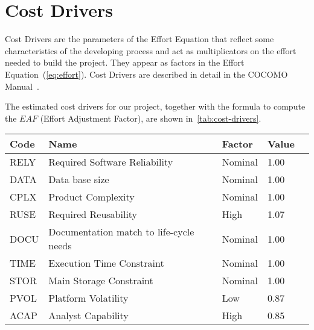 \section{Cost Drivers}

Cost Drivers are the parameters of the Effort Equation that reflect some characteristics of the developing process and act as multiplicators on the effort needed to build the project. They appear as factors in the Effort Equation~(\autoref{eq:effort}). Cost Drivers are described in detail in the COCOMO Manual~\cite[p.~25]{cocomo-manual}.

The estimated cost drivers for our project, together with the formula to compute the $EAF$ (Effort Adjustment Factor), are shown in~\autoref{tab:cost-drivers}.

\begin{table}[p]
    \centering
    \begin{tabular}{| l | l | l | l | l |}
        \hline
        \textbf{Code}   & \textbf{Name}                             & \textbf{Factor}      & \textbf{Value}    \\
        \hline
        RELY            & Required Software Reliability             & Nominal              & 1.00              \\
        \hline
        DATA            & Data base size                            & Nominal              & 1.00              \\
        \hline
        CPLX            & Product Complexity                        & Nominal              & 1.00              \\
        \hline
        RUSE            & Required Reusability                      & High                 & 1.07              \\
        \hline
        DOCU            & Documentation match to life-cycle needs   & Nominal              & 1.00              \\
        \hline
        TIME            & Execution Time Constraint                 & Nominal              & 1.00              \\
        \hline
        STOR            & Main Storage Constraint                   & Nominal              & 1.00              \\
        \hline
        PVOL            & Platform Volatility                       & Low                  & 0.87              \\
        \hline
        ACAP            & Analyst Capability                        & High                 & 0.85              \\

\end{tabular}
\end{table}
